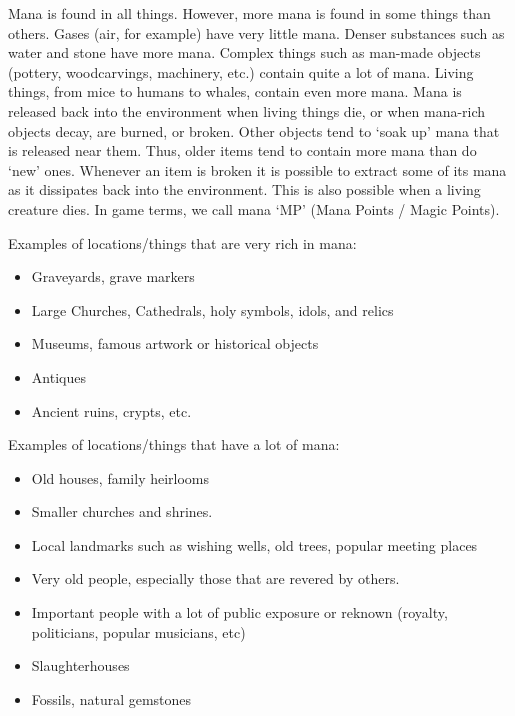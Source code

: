 \documentclass[twoside]{book}
\begin{document}
    {  
      Mana is found in all things. However, more mana is
             found in some things than others. Gases (air, for example)
             have very little mana. Denser substances such as water and
             stone have more mana. Complex things such as man-made
             objects (pottery, woodcarvings, machinery, etc.) contain
             quite a lot of mana. Living things, from mice to humans to
             whales, contain even more mana. Mana is released back into
             the environment when living things die, or when mana-rich
             objects decay, are burned, or broken. Other objects tend to
             `soak up' mana that is released near them. Thus,
             older items tend to contain more mana than do
             `new' ones. Whenever an item is broken it is
             possible to extract some of its mana as it dissipates back
             into the environment. This is also possible when a living
             creature dies. In game terms, we call mana `MP'
             (Mana Points / Magic Points). 
    }
  
    {  
      Examples of locations/things that are very rich in
             mana: 
    }
  
\begin{itemize}
      
  \item   Graveyards, grave markers 
  \item   Large Churches, Cathedrals, holy symbols, idols,
               and relics 
  \item   Museums, famous artwork or historical objects
               
  \item   Antiques 
  \item   Ancient ruins, crypts, etc. 
\end{itemize}
  
    {  
      Examples of locations/things that have a lot of mana:
             
    }
  
\begin{itemize}
      
  \item   Old houses, family heirlooms 
  \item   Smaller churches and shrines. 
  \item   Local landmarks such as wishing wells, old trees,
               popular meeting places 
  \item   Very old people, especially those that are revered
               by others. 
  \item   Important people with a lot of public exposure or
               reknown (royalty, politicians, popular musicians, etc)
               
  \item   Slaughterhouses 
  \item   Fossils, natural gemstones 
\end{itemize}
  
\end{document}
